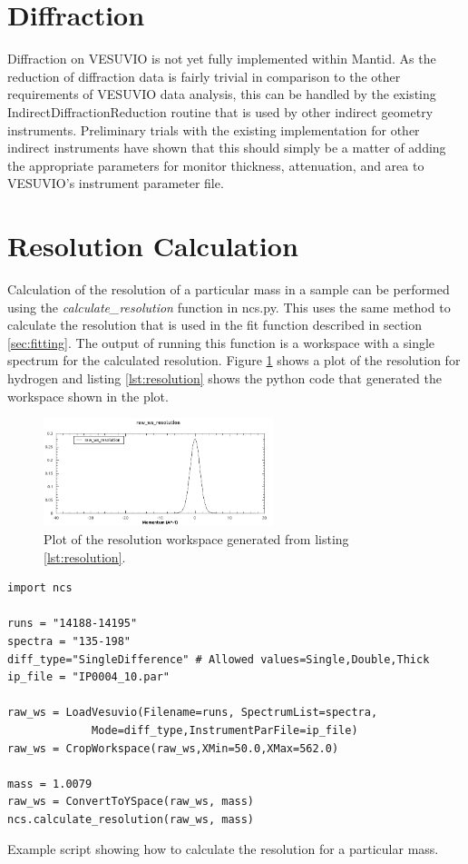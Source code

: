 \documentclass[paper=a4, fontsize=11pt]{scrartcl}	%
\numberwithin{equation}{section}															%
\numberwithin{figure}{section}																%
\numberwithin{table}{section}
\begin{document}
\section{Diffraction}
\label{sec:diffraction}
Diffraction on VESUVIO is not yet fully implemented within Mantid. As the reduction of diffraction data is fairly trivial in comparison to the other requirements of VESUVIO data analysis, this can be handled by the existing IndirectDiffractionReduction routine that is used by other indirect geometry instruments. Preliminary trials with the existing implementation for other indirect instruments have shown that this should simply be a matter of adding the appropriate parameters for monitor thickness, attenuation, and area to VESUVIO's instrument parameter file.

\section{Resolution Calculation}
Calculation of the resolution of a particular mass in a sample can be performed using the \textit{calculate\_resolution} function in ncs.py. This uses the same method to calculate the resolution that is used in the fit function described in section \ref{sec:fitting}. The output of running this function is a workspace with a single spectrum for the calculated resolution. Figure \ref{fig:resolution} shows a plot of the resolution for hydrogen and listing \ref{lst:resolution} shows the python code that generated the workspace shown in the plot.

\begin{figure}[H]
\centering
\includegraphics[width=0.6\textwidth]{img/resolution.png}
\caption{Plot of the resolution workspace generated from listing \ref{lst:resolution}.}
\label{fig:resolution}
\end{figure}


\begin{listing}[H]
\begin{verbatim}
import ncs

runs = "14188-14195"
spectra = "135-198"
diff_type="SingleDifference" # Allowed values=Single,Double,Thick
ip_file = "IP0004_10.par"

raw_ws = LoadVesuvio(Filename=runs, SpectrumList=spectra,
		     Mode=diff_type,InstrumentParFile=ip_file)
raw_ws = CropWorkspace(raw_ws,XMin=50.0,XMax=562.0)

mass = 1.0079
raw_ws = ConvertToYSpace(raw_ws, mass)
ncs.calculate_resolution(raw_ws, mass)
\end{verbatim}
\caption{Example script showing how to calculate the resolution for a particular mass.}
\label{lst:resolution}
\end{listing}
\end{document}
